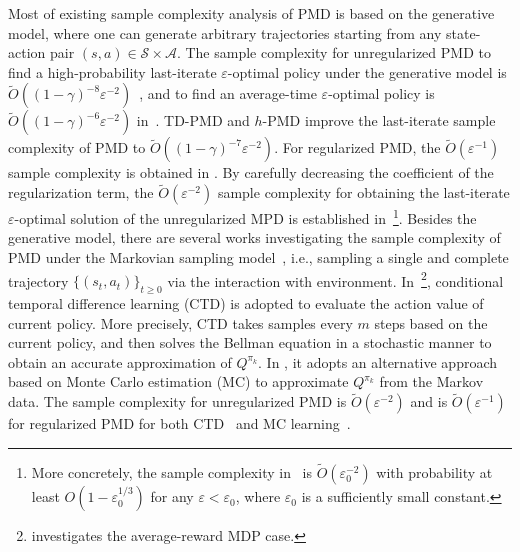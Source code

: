 \documentclass[10pt]{article}
\newcommand{\calA}{\mathcal{A}}
\newcommand{\calS}{\mathcal{S}}
\theoremstyle{plain}
\theoremstyle{definition}
\begin{document}
Most of existing sample complexity analysis of PMD is based on the generative model, where one can generate arbitrary trajectories starting from any state-action pair $(s,a) \in \calS \times \calA$. The sample complexity for unregularized PMD  to find a high-probability last-iterate $\varepsilon$-optimal policy  under the generative model is $\tilde O((1-\gamma)^{-8}\varepsilon^{-2})$~\citep{Xiao_2022,Johnson_Pike-Burke_Rebeschini_2023}, and to find an average-time $\varepsilon$-optimal policy is $\tilde O((1-\gamma)^{-6}\varepsilon^{-2})$ in~\citet{Lan_2021}. TD-PMD \citep{liu2025tdpmd} and $h$-PMD \citep{protopapas2024policy} improve the last-iterate sample complexity of PMD to $\tilde O((1-\gamma)^{-7}\varepsilon^{-2})$. For regularized PMD, the $\tilde O(\varepsilon^{-1})$ sample complexity is obtained in \citet{Lan_2021}. By carefully decreasing the coefficient of the regularization term, the $\tilde O(\varepsilon^{-2})$ sample complexity for obtaining the last-iterate  $\varepsilon$-optimal solution of the unregularized MPD is established in~\citet{Lan_2021, Li_Zhao_Lan_2022}\footnote{More concretely, the sample complexity in~\citet{Li_Zhao_Lan_2022} is $\tilde O(\varepsilon_0^{-2})$ with probability at least $O(1-\varepsilon_0^{1/3})$ for any $\varepsilon < \varepsilon_0$, where $\varepsilon_0$ is a sufficiently small constant.}. Besides the generative model, there are several works investigating the sample complexity of PMD under the Markovian sampling model~\citep{Lan_2021,li2024stochastic,li2025policy}, i.e., sampling a single and complete trajectory $\{ (s_t, a_t) \}_{t\geq 0}$ via the interaction with environment. In~\citet{Lan_2021,li2024stochastic}\footnote{\citet{li2024stochastic} investigates the average-reward MDP case.}, conditional temporal difference learning (CTD) is adopted to  evaluate the action value of current policy. More precisely, CTD  takes samples every $m$ steps based on the current policy, and then  solves the Bellman equation in a stochastic manner to obtain an accurate approximation of $Q^{\pi_k}$. In \citet{li2025policy}, it adopts an alternative approach based on Monte Carlo estimation (MC) to approximate $Q^{\pi_k}$ from the Markov data. The sample complexity for unregularized PMD is $\tilde O(\varepsilon^{-2})$ and  is $\tilde O(\varepsilon^{-1})$ for regularized PMD for  both CTD~\citep{Lan_2021,li2024stochastic} and MC learning~\citep{li2025policy}. 

\end{document}
